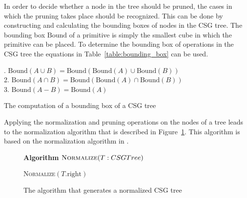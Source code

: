 \documentclass[a4paper,10pt,twocolumn]{article}
\newcommand{\Bound}{\mbox{Bound}}
\begin{document}
    In order to decide whether a node in the tree should be pruned, the cases in which the pruning takes place should be recognized. This can be done by constructing and calculating the bounding boxes of nodes in the CSG tree. The bounding box $\Bound$ of a primitive is simply the smallest cube in which the primitive can be placed. To determine the bounding box of operations in the CSG tree the equations in Table~\ref{table:bounding_box} can be used.\\

    \begin{table}[h]
        {\fontsize{8.7}{10}. $\Bound(A \cup B) = \Bound(\Bound(A) \cup \Bound(B))$\\
            2. $\Bound(A \cap B) = \Bound(\Bound(A) \cap \Bound(B))$\\
            3. $\Bound(A - B)    = \Bound(A)$\\
        }
        \caption{The computation of a bounding box of a CSG tree}
        \label{table:bounding_box}
    \end{table}

    Applying the normalization and pruning operations on the nodes of a tree leads to the normalization algorithm that is described in  Figure~\ref{figure:algorithm}. This algorithm is based on the normalization algorithm in \cite{Wiegand96}.\\

    \begin{figure}[ht]
            \textbf{Algorithm} $\textsc{Normalize}(T: CSGTree)$\\
            \noindent
            \begin{algorithm}[H]
                \BlankLine
                \BlankLine
                \textsc{Normalize}$(T\mbox{.right})$\;
            \end{algorithm}
        \caption{The algorithm that generates a normalized CSG tree}
        \label{figure:algorithm}
    \end{figure}
\end{document}
